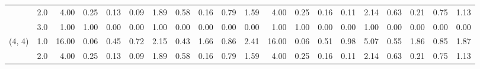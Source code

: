 \begin{tabular}{llrrrrrrrrrrrrrrrrrr}
       & 2.0 &               4.00 &                     0.25 &                                 0.13 &                             0.09 &                           1.89 &                                               0.58 &                                            0.16 &                                            0.79 &                                        1.59 &               4.00 &                     0.25 &                                 0.16 &                             0.11 &                           2.14 &                                               0.63 &                                            0.21 &                                            0.75 &                                        1.13 \\
       & 3.0 &               1.00 &                     1.00 &                                 0.00 &                             0.00 &                           1.00 &                                               0.00 &                                            0.00 &                                            0.00 &                                        0.00 &               1.00 &                     1.00 &                                 0.00 &                             0.00 &                           1.00 &                                               0.00 &                                            0.00 &                                            0.00 &                                        0.00 \\
(4, 4) & 1.0 &              16.00 &                     0.06 &                                 0.45 &                             0.72 &                           2.15 &                                               0.43 &                                            1.66 &                                            0.86 &                                        2.41 &              16.00 &                     0.06 &                                 0.51 &                             0.98 &                           5.07 &                                               0.55 &                                            1.86 &                                            0.85 &                                        1.87 \\
       & 2.0 &               4.00 &                     0.25 &                                 0.13 &                             0.09 &                           1.89 &                                               0.58 &                                            0.16 &                                            0.79 &                                        1.59 &               4.00 &                     0.25 &                                 0.16 &                             0.11 &                           2.14 &                                               0.63 &                                            0.21 &                                            0.75 &                                        1.13 \\

\end{tabular}
